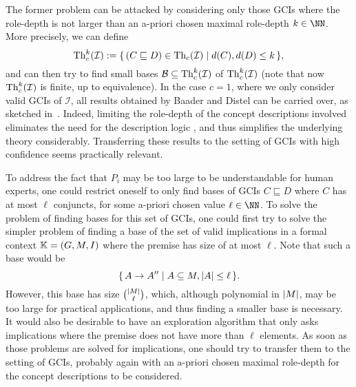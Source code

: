 The former problem can be attacked by considering only those GCIs where the role-depth is
not larger than an a-priori chosen maximal role-depth $k \in \NN$.  More precisely, we can
define
\begin{equation*}
  \operatorname{Th}_{c}^{k}(\mathcal{I}) := {\{\, (C \sqsubseteq D) \in \operatorname{Th}_{c}(\mathcal{I}) \mid d(C), d(D)
    \leq k \,\}},
\end{equation*}
and can then try to find small bases $\mathcal{B} \subseteq \operatorname{Th}_{c}^{k}(\mathcal{I})$ of
$\operatorname{Th}_{c}^{k}(\mathcal{I})$ (note that now $\operatorname{Th}_{c}^{k}(\mathcal{I})$ is finite, up to
equivalence).  In the case $c = 1$, where we only consider valid GCIs of $\mathcal{I}$,
all results obtained by Baader and Distel can be carried over, as sketched
in~\cite{FCA-and-Logics}.  Indeed, limiting the role-depth of the concept descriptions
involved eliminates the need for the description logic \ELgfpbot, and thus simplifies the
underlying theory considerably.  Transferring these results to the setting of GCIs with
high confidence seems practically relevant.

To address the fact that $P_{i}$ may be too large to be understandable for human experts,
one could restrict oneself to only find bases of GCIs $C \sqsubseteq D$ where $C$ has at
most $\ell$ conjuncts, for some a-priori chosen value $\ell \in \NN$.  To solve the
problem of finding bases for this set of GCIs, one could first try to solve the simpler
problem of finding a base of the set of valid implications in a formal context ${\mathbb{K}} =
(G, M, I)$ where the premise has size of at most $\ell$.  Note that such a base would be
\begin{equation*}
  {\ensuremath{\{\, A \to A'' \mid A \subseteq M, \lvert A\rvert \leq \ell \,\}}}.
\end{equation*}
However, this base has size $\binom{\lvert M\rvert}{\ell}$, which, although polynomial in $\lvert M\rvert$, may be too large for practical applications, and thus finding a smaller base is
necessary.  It would also be desirable to have an exploration algorithm that only asks
implications where the premise does not have more than $\ell$ elements.  As soon as those
problems are solved for implications, one should try to transfer them to the setting of
GCIs, probably again with an a-priori chosen maximal role-depth for the concept
descriptions to be considered.


